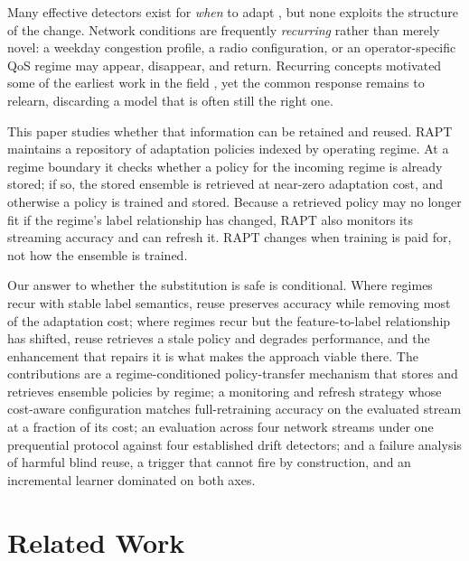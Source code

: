 \documentclass[conference]{IEEEtran}
\begin{document}
Many effective detectors exist for \emph{when} to adapt
\cite{bifet2007learning,page1954continuous,gama2004learning,baena2006early,ross2012exponentially,dos2016fast,brockhoff2020time},
but none exploits the structure of the change. Network conditions are
frequently \emph{recurring} rather than merely novel: a weekday congestion profile,
a radio configuration, or an operator-specific QoS regime may appear, disappear, and
return. Recurring concepts motivated some of the earliest work in the field
\cite{schlimmer1986incremental,widmer1994combining}, yet the common response remains
to relearn, discarding a model that is often still the right one.

This paper studies whether that information can be retained and reused. RAPT
maintains a repository of adaptation policies indexed by operating regime. At a
regime boundary it checks whether a policy for the incoming regime is already
stored; if so, the stored ensemble is retrieved at near-zero adaptation cost, and
otherwise a policy is trained and stored. Because a retrieved policy may no longer
fit if the regime's label relationship has changed, RAPT also monitors its
streaming accuracy and can refresh it. RAPT changes when training is paid for, not
how the ensemble is trained.

Our answer to whether the substitution is safe is conditional. Where regimes recur
with stable label semantics, reuse preserves accuracy while removing most of the
adaptation cost; where regimes recur but the feature-to-label relationship has
shifted, reuse retrieves a stale policy and degrades performance, and the
enhancement that repairs it is what makes the approach viable there. The
contributions are a regime-conditioned policy-transfer mechanism that stores and
retrieves ensemble policies by regime; a monitoring and refresh strategy whose
cost-aware configuration matches full-retraining accuracy on the evaluated stream at a
fraction of its cost;
an evaluation across four network streams under one prequential protocol against four
established drift detectors; and a failure analysis of harmful blind reuse, a trigger
that cannot fire by construction, and an incremental learner dominated on both axes.

\section{Related Work}
\end{document}
